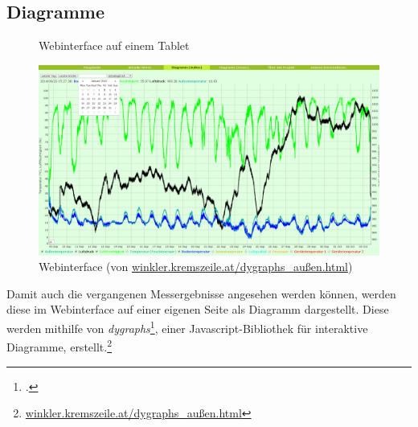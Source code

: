 \subsection{Diagramme}
\label{subsec:Diagramme}

\begin{figure}[h]
  \centering
  \caption{Webinterface auf einem Tablet}
  \label{fig:dygraphs_tablet}
\end{figure}

\begin{figure}[h]
  \centering
     \includegraphics[width=\textwidth]{figures/dygraphs.png}
  \caption{Webinterface (von \href{http://winkler.kremszeile.at/dygraphs\_au\%C3\%9Fen.html}{winkler.kremszeile.at/dygraphs\_außen.html})}
  \label{fig:dygraphs}
\end{figure}
Damit auch die vergangenen Messergebnisse angesehen werden können, werden diese im Webinterface auf einer eigenen Seite als Diagramm dargestellt. Diese werden mithilfe von \emph{dygraphs}\footcite{dygraphs}, einer \gls{Javascript}-Bibliothek für interaktive Diagramme, erstellt.\footnote{\href{http://winkler.kremszeile.at/dygraphs_au\%C3\%9Fen.html}{winkler.kremszeile.at/dygraphs\_außen.html}}

